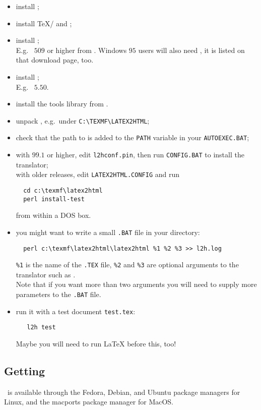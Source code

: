 \begin{itemize}
\item install ;
\item install \TeX/\LaTeXe{} and ;
\item install \Perl{};\\
   E.g.\  $509$ or higher from \ActiveStateURL.
   Windows $95$ users will also need , it is listed on
   that download page, too.
\item install ;\\
    E.g.\  $5.50$.
\item install the  tools library from \NetpbmWinURL.
\item unpack \latextohtml{}, e.g.\ under \verb|C:\TEXMF\LATEX2HTML|;
\item check that the path to  is added to the
  \texttt{PATH} variable in your \texttt{AUTOEXEC.BAT};
\item with \latextohtml{} $99.1$ or higher, edit \texttt{l2hconf.pin},
  then run \texttt{CONFIG.BAT} to install the translator;\\
  with older releases, edit \texttt{LATEX2HTML.CONFIG} and run
  \begin{verbatim}
  cd c:\texmf\latex2html
  perl install-test
  \end{verbatim}
  from within a DOS box.
\item you might want to write a small \texttt{.BAT} file in your
  \latextohtml{} directory:
  \begin{verbatim}
  perl c:\texmf\latex2html\latex2html %1 %2 %3 >> l2h.log
  \end{verbatim}
  \texttt{\%1} is the name of the \texttt{.TEX} file,
  \texttt{\%2} and \texttt{\%3} are optional arguments to the
  translator such as .\\
  Note that if you want more than two arguments you will need
  to supply more parameters to the \texttt{.BAT} file.
\item run it with a test document \texttt{test.tex}:
  \begin{verbatim}
   l2h test
  \end{verbatim}
  Maybe you will need to run \LaTeX{} before this, too!
\end{itemize}


\subsection[center]{Getting \protect\latextohtml}
\tableofchildlinks*
\htmlrule
\latextohtml\ is available through the Fedora, Debian, and Ubuntu
package managers for Linux, and the macports package manager for MacOS.

